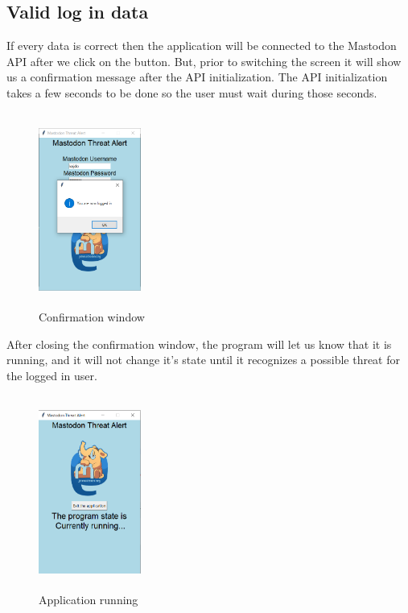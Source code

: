 \subsection{Valid log in data}
\label{ss:correct_data}
If every data is correct then the application will be connected to the Mastodon API after
we click on the button. But, prior to switching the screen it will show us a confirmation
message after the API initialization. The API initialization takes a few seconds to be done so the user must wait during those seconds.
\begin{figure}[H]
	\centering
	\includegraphics[width=0.3\textwidth,height=240px]{images/confimlogin.png}
	\caption{Confirmation window}
	\label{fig:confirm_logn}
\end{figure}
After closing the confirmation window, 
the program will let us know that it is running, and it will not
change it's state until it recognizes a possible threat for the logged in user.
\begin{figure}[H]
	\centering
	\includegraphics[width=0.3\textwidth,height=240px]{images/runningapp.png}
	\caption{Application running}
	\label{fig:running_app}
\end{figure}

